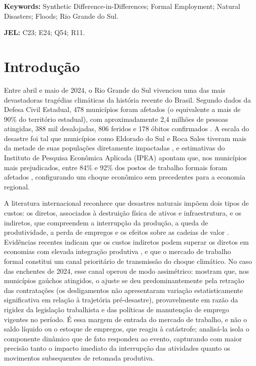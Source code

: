\documentclass[a4paper,12pt]{article}
\renewcommand{\thefootnote}{\alph{footnote}}
\begin{document}
\vspace{0.6em}
\noindent\textbf{Keywords:} Synthetic Difference-in-Differences; Formal Employment;
Natural Disasters; Floods; Rio Grande do Sul.

\vspace{0.8em}
\noindent\textbf{JEL:} C23; E24; Q54; R11.

\renewcommand{\thefootnote}{\arabic{footnote}}
\setcounter{footnote}{0}

\section{Introdução}
\label{sec:introducao}

Entre abril e maio de 2024, o Rio Grande do Sul vivenciou uma das mais devastadoras
tragédias climáticas da história recente do Brasil. Segundo dados da Defesa Civil
Estadual, 478 municípios foram afetados (o equivalente a mais de 90\% do território
estadual), com aproximadamente 2,4 milhões de pessoas atingidas, 388 mil
desalojadas, 806 feridos e 178 óbitos confirmados \cite{martins2024}. A escala do
desastre foi tal que municípios como Eldorado do Sul e Roca Sales tiveram mais da
metade de suas populações diretamente impactadas \cite{teixeira2024}, e estimativas do
Instituto de Pesquisa Econômica Aplicada (IPEA) apontam que, nos municípios mais
prejudicados, entre 84\% e 92\% dos postos de trabalho formais foram afetados
\cite{ipea2024}, configurando um choque econômico sem precedentes para a economia
regional.

A literatura internacional reconhece que desastres naturais impõem dois tipos de custos:
os diretos, associados à destruição física de ativos e infraestrutura, e os indiretos, que
compreendem a interrupção da produção, a queda de produtividade, a perda de empregos
e os efeitos sobre as cadeias de valor \cite{kousky2014, berlemann2018}. Evidências
recentes indicam que os custos indiretos podem superar os diretos em economias com
elevada integração produtiva \cite{botzen2019}, e que o mercado de trabalho formal
constitui um canal prioritário de transmissão do choque climático. No caso das enchentes
de 2024, esse canal operou de modo assimétrico:  mostram que,
nos municípios gaúchos atingidos, o ajuste se deu predominantemente pela retração das
contratações (os desligamentos não apresentaram variação estatisticamente significativa
em relação à trajetória pré-desastre), provavelmente em razão da rigidez da legislação
trabalhista e das políticas de manutenção de emprego vigentes no período. É essa margem
de entrada do mercado de trabalho, e não o saldo líquido ou o estoque de empregos, que
reagiu à catástrofe; analisá-la isola o componente dinâmico que de fato respondeu ao
evento, capturando com maior precisão tanto o impacto imediato da interrupção das
atividades quanto os movimentos subsequentes de retomada produtiva.
\end{document}
